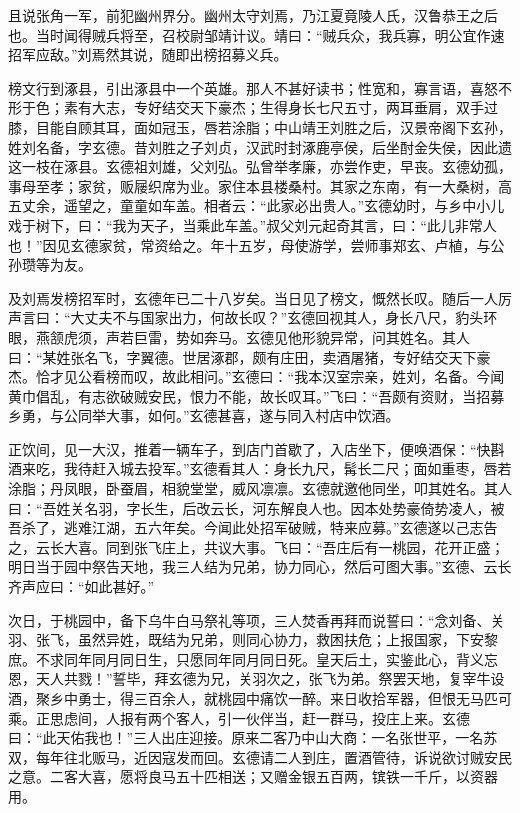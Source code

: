 且说张角一军，前犯幽州界分。幽州太守刘焉，乃江夏竟陵人氏，汉鲁恭王之后也。当时闻得贼兵将至，召校尉邹靖计议。靖曰：“贼兵众，我兵寡，明公宜作速招军应敌。”刘焉然其说，随即出榜招募义兵。

榜文行到涿县，引出涿县中一个英雄。那人不甚好读书；性宽和，寡言语，喜怒不形于色；素有大志，专好结交天下豪杰；生得身长七尺五寸，两耳垂肩，双手过膝，目能自顾其耳，面如冠玉，唇若涂脂；中山靖王刘胜之后，汉景帝阁下玄孙，姓刘名备，字玄德。昔刘胜之子刘贞，汉武时封涿鹿亭侯，后坐酎金失侯，因此遗这一枝在涿县。玄德祖刘雄，父刘弘。弘曾举孝廉，亦尝作吏，早丧。玄德幼孤，事母至孝；家贫，贩屦织席为业。家住本县楼桑村。其家之东南，有一大桑树，高五丈余，遥望之，童童如车盖。相者云：“此家必出贵人。”玄德幼时，与乡中小儿戏于树下，曰：“我为天子，当乘此车盖。”叔父刘元起奇其言，曰：“此儿非常人也！”因见玄德家贫，常资给之。年十五岁，母使游学，尝师事郑玄、卢植，与公孙瓒等为友。

及刘焉发榜招军时，玄德年已二十八岁矣。当日见了榜文，慨然长叹。随后一人厉声言曰：“大丈夫不与国家出力，何故长叹？”玄德回视其人，身长八尺，豹头环眼，燕颔虎须，声若巨雷，势如奔马。玄德见他形貌异常，问其姓名。其人曰：“某姓张名飞，字翼德。世居涿郡，颇有庄田，卖酒屠猪，专好结交天下豪杰。恰才见公看榜而叹，故此相问。”玄德曰：“我本汉室宗亲，姓刘，名备。今闻黄巾倡乱，有志欲破贼安民，恨力不能，故长叹耳。”飞曰：“吾颇有资财，当招募乡勇，与公同举大事，如何。”玄德甚喜，遂与同入村店中饮酒。

正饮间，见一大汉，推着一辆车子，到店门首歇了，入店坐下，便唤酒保：“快斟酒来吃，我待赶入城去投军。”玄德看其人：身长九尺，髯长二尺；面如重枣，唇若涂脂；丹凤眼，卧蚕眉，相貌堂堂，威风凛凛。玄德就邀他同坐，叩其姓名。其人曰：“吾姓关名羽，字长生，后改云长，河东解良人也。因本处势豪倚势凌人，被吾杀了，逃难江湖，五六年矣。今闻此处招军破贼，特来应募。”玄德遂以己志告之，云长大喜。同到张飞庄上，共议大事。飞曰：“吾庄后有一桃园，花开正盛；明日当于园中祭告天地，我三人结为兄弟，协力同心，然后可图大事。”玄德、云长齐声应曰：“如此甚好。”

次日，于桃园中，备下乌牛白马祭礼等项，三人焚香再拜而说誓曰：“念刘备、关羽、张飞，虽然异姓，既结为兄弟，则同心协力，救困扶危；上报国家，下安黎庶。不求同年同月同日生，只愿同年同月同日死。皇天后土，实鉴此心，背义忘恩，天人共戮！”誓毕，拜玄德为兄，关羽次之，张飞为弟。祭罢天地，复宰牛设酒，聚乡中勇士，得三百余人，就桃园中痛饮一醉。来日收拾军器，但恨无马匹可乘。正思虑间，人报有两个客人，引一伙伴当，赶一群马，投庄上来。玄德曰：“此天佑我也！”三人出庄迎接。原来二客乃中山大商：一名张世平，一名苏双，每年往北贩马，近因寇发而回。玄德请二人到庄，置酒管待，诉说欲讨贼安民之意。二客大喜，愿将良马五十匹相送；又赠金银五百两，镔铁一千斤，以资器用。

